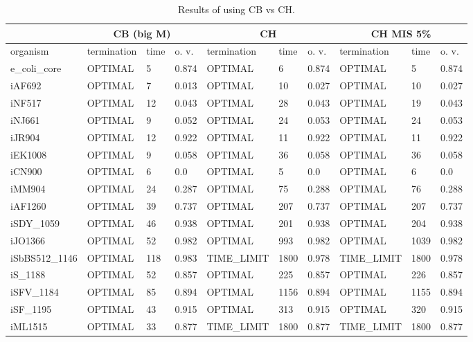 \begin{table}[!ht]
    \small
    \centering
    \begin{tabular}{|l|l|l|l|l|l|l|l|l|l|}
    \hline
        \multicolumn{1}{|c}{} & \multicolumn{3}{|c|}{CB (big M)} & \multicolumn{3}{|c|}{CH} & \multicolumn{3}{|c|}{CH MIS 5\%} \\ \hline
        organism & termination & time & o. v. & termination & time & o. v. & termination & time & o. v. \\ \hline
        e\_coli\_core & OPTIMAL & 5 & 0.874 & OPTIMAL & 6 & 0.874 & OPTIMAL & 5 & 0.874 \\ \hline
        iAF692 & OPTIMAL & 7 & 0.013 & OPTIMAL & 10 & 0.027 & OPTIMAL & 10 & 0.027 \\ \hline
        iNF517 & OPTIMAL & 12 & 0.043 & OPTIMAL & 28 & 0.043 & OPTIMAL & 19 & 0.043 \\ \hline
        iNJ661 & OPTIMAL & 9 & 0.052 & OPTIMAL & 24 & 0.053 & OPTIMAL & 24 & 0.053 \\ \hline
        iJR904 & OPTIMAL & 12 & 0.922 & OPTIMAL & 11 & 0.922 & OPTIMAL & 11 & 0.922 \\ \hline
        iEK1008 & OPTIMAL & 9 & 0.058 & OPTIMAL & 36 & 0.058 & OPTIMAL & 36 & 0.058 \\ \hline
        iCN900 & OPTIMAL & 6 & 0.0 & OPTIMAL & 5 & 0.0 & OPTIMAL & 6 & 0.0 \\ \hline
        iMM904 & OPTIMAL & 24 & 0.287 & OPTIMAL & 75 & 0.288 & OPTIMAL & 76 & 0.288 \\ \hline
        iAF1260 & OPTIMAL & 39 & 0.737 & OPTIMAL & 207 & 0.737 & OPTIMAL & 207 & 0.737 \\ \hline
        iSDY\_1059 & OPTIMAL & 46 & 0.938 & OPTIMAL & 201 & 0.938 & OPTIMAL & 204 & 0.938 \\ \hline
        iJO1366 & OPTIMAL & 52 & 0.982 & OPTIMAL & 993 & 0.982 & OPTIMAL & 1039 & 0.982 \\ \hline
        iSbBS512\_1146 & OPTIMAL & 118 & 0.983 & TIME\_LIMIT & 1800 & 0.978 & TIME\_LIMIT & 1800 & 0.978 \\ \hline
        iS\_1188 & OPTIMAL & 52 & 0.857 & OPTIMAL & 225 & 0.857 & OPTIMAL & 226 & 0.857 \\ \hline
        iSFV\_1184 & OPTIMAL & 85 & 0.894 & OPTIMAL & 1156 & 0.894 & OPTIMAL & 1155 & 0.894 \\ \hline
        iSF\_1195 & OPTIMAL & 43 & 0.915 & OPTIMAL & 313 & 0.915 & OPTIMAL & 320 & 0.915 \\ \hline
        iML1515 & OPTIMAL & 33 & 0.877 & TIME\_LIMIT & 1800 & 0.877 & TIME\_LIMIT & 1800 & 0.877 \\ \hline
    \end{tabular}
    \caption{\label{Tab:ch_vs_cb} Results of using CB vs CH.}
\end{table}

